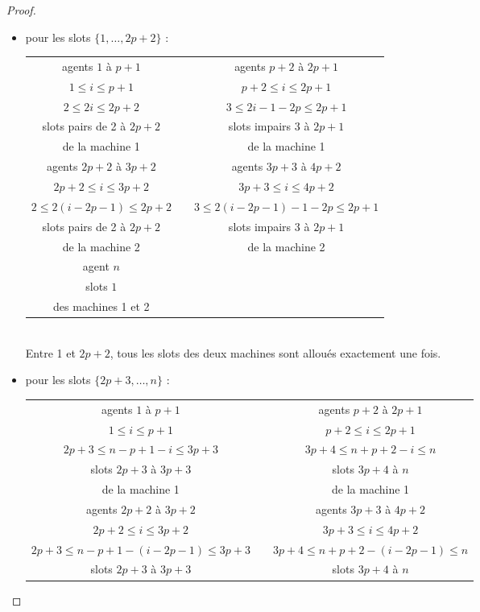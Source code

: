 \documentclass[12pt]{article}
\theoremstyle{definition}
\begin{document}
\begin{itemize}
\begin{proof}
\begin{itemize}
\item pour les slots $\{1,\dots,2p+2\}$ :\\
\begin{tabular}{ccc}
agents $1$ à $p+1$  & & agents $p+2$ à $2p+1$   \\
$1\leq i \leq p+1 $ & & $p+2\leq i \leq 2p+1$   \\
$2\leq 2i\leq 2p+2$ & & $3\leq 2i-1-2p\leq 2p+1$\\
slots pairs de 2 à $2p+2$     & & slots impairs $3$ à $2p+1$  \\
de la machine 1   & & de la machine 1       \\
\hline
agents $2p+2$ à $3p+2$ & & agents $3p+3$ à $4p+2$\\
$2p+2\leq i \leq 3p+2 $ & & $3p+3\leq i \leq 4p+2$   \\
$2\leq 2(i-2p-1)\leq 2p+2$ & & $3\leq 2(i-2p-1)-1-2p\leq 2p+1$\\
slots pairs de 2 à $2p+2$     & & slots impairs $3$ à $2p+1$  \\
de la machine 2   & & de la machine 2       \\
\hline
agent $n$ & &\\
slots $1$ & & \\
des machines 1 et 2&&\\
\end{tabular}\\
Entre 1 et $2p+2$, tous les slots des deux machines sont alloués exactement une fois.
\item pour les slots $\{2p+3,\dots,n\}$ :\\
\begin{tabular}{ccc}
agents $1$ à $p+1$  & & agents $p+2$ à $2p+1$   \\
$1\leq i \leq p+1 $ & & $p+2\leq i \leq 2p+1$   \\
$2p+3 \leq n-p+1-i\leq 3p+3$ & & $3p+4\leq n+p+2-i\leq n$\\
slots $2p+3$ à $3p+3$     & & slots $3p+4$ à $n$  \\
de la machine 1   & & de la machine 1       \\
\hline
agents $2p+2$ à $3p+2$ & & agents $3p+3$ à $4p+2$\\
$2p+2\leq i \leq 3p+2 $ & & $3p+3\leq i \leq 4p+2$   \\
$2p+3 \leq n-p+1-(i-2p-1)\leq 3p+3$ & & $3p+4\leq n+p+2-(i-2p-1)\leq n$\\
slots $2p+3$ à $3p+3$     & & slots $3p+4$ à $n$  \\

\end{tabular}
\end{itemize}
\end{proof}
\end{itemize}
\end{document}
